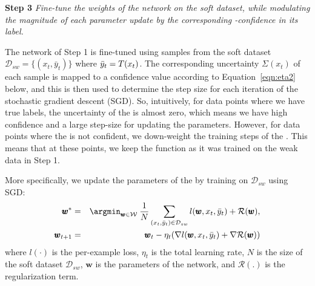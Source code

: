 %
\textbf{Step 3} \emph{Fine-tune the weights of the \std network on the soft dataset, while modulating the magnitude of each parameter update by the corresponding \tch-confidence in its label.}

The \std network of Step 1 is fine-tuned using samples from the soft dataset $\mathcal{D}_{sw}=\{(x_t, \bar{y}_t)\}$ where $\bar{y}_t=T(x_t)$.
The corresponding uncertainty $\Sigma(x_t)$ of each sample is mapped to a confidence value according to Equation~\ref{eqn:eta2} below, and this is then used to determine the step size for each iteration of the stochastic gradient descent (SGD). So, intuitively, for data points where we have true labels, the uncertainty of the \tch is almost zero, which means we have high confidence and a large step-size for updating the parameters. However, for data points where the \tch is not confident, we down-weight the training steps of the \std. This means that at these points, we keep the \std function as it was trained on the weak data in Step 1.

More specifically, we update the parameters of the \std by training on $\mathcal{D}_{sw}$ using SGD:
\begin{eqnarray*}
  \pmb{w}^* &=& \argmin_{\pmb{w} \in \mathcal{W}} \> \frac{1}{N}\sum_{(x_t,\bar{y}_t) \in \mathcal{D}_{sw}}l(\pmb{w}, x_t, \bar{y}_t) + \mathcal{R}(\pmb{w}), \\
  \pmb{w}_{t+1} &=& \pmb{w}_t - \eta_t(\nabla l(\pmb{w},x_t,\bar{y}_t) + \nabla \mathcal{R}(\pmb{w}))
\end{eqnarray*}
where $l(\cdot)$ is the per-example loss, $\eta_t$ is the total learning rate, $N$ is the size of the soft dataset $\mathcal{D}_{sw}$, $\pmb{w}$ is the parameters of the \std network, and $\mathcal{R(.)}$ is the regularization term. %

